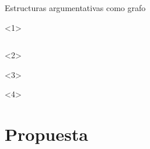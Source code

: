 \documentclass{beamer}
\begin{document}
\begin{frame}{Estructuras argumentativas como grafo}
    \vspace{0.5cm}
    \begin{onlyenv}<1>
        \begin{columns}
            \begin{column}{0.32\textwidth}
                
            \end{column}
            \begin{column}{0.68\textwidth}
                
            \end{column}
        \end{columns}
    \end{onlyenv}
    \begin{onlyenv}<2>
        \begin{figure}
            
        \end{figure}
    \end{onlyenv}
    \begin{onlyenv}<3>
        \begin{figure}
            
        \end{figure}
    \end{onlyenv}
    \begin{onlyenv}<4>
        \begin{figure}
            
        \end{figure}
    \end{onlyenv}

\end{frame}

\section{Propuesta}
\end{document}
